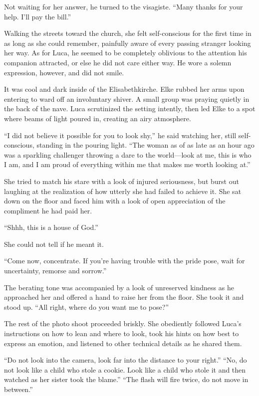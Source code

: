 Not waiting for her answer, he turned to the visagiste. ``Many thanks for your help. I'll pay the bill.''

Walking the streets toward the church, she felt self-conscious for the first time in as long as she could remember, painfully aware of every passing stranger looking her way. As for Luca, he seemed to be completely oblivious to the attention his companion attracted, or else he did not care either way. He wore a solemn expression, however, and did not smile.

\sectionline

It was cool and dark inside of the Elisabethkirche. Elke rubbed her arms upon entering to ward off an involuntary shiver. A small group was praying quietly in the back of the nave. Luca scrutinized the setting intently, then led Elke to a spot where beams of light poured in, creating an airy atmosphere.

``I did not believe it possible for you to look shy,'' he said watching her, still self-conscious, standing in the pouring light. ``The woman as of as late as an hour ago was a sparkling challenger throwing a dare to the world---look at me, this is who I am, and I am proud of everything within me that makes me worth looking at.''

She tried to match his stare with a look of injured seriousness, but burst out laughing at the realization of how utterly she had failed to achieve it. She sat down on the floor and faced him with a look of open appreciation of the compliment he had paid her.

``Shhh, this is a house of God.''

She could not tell if he meant it.

``Come now, concentrate. If you're having trouble with the pride pose, wait for uncertainty, remorse and sorrow.''

The berating tone was accompanied by a look of unreserved kindness as he approached her and offered a hand to raise her from the floor. She took it and stood up. ``All right, where do you want me to pose?''

The rest of the photo shoot proceeded briskly. She obediently followed Luca's instructions on how to lean and where to look, took his hints on how best to express an emotion, and listened to other technical details as he shared them.

``Do not look into the camera, look far into the distance to your right.'' ``No, do not look like a child who stole a cookie. Look like a child who stole it and then watched as her sister took the blame.'' ``The flash will fire twice, do not move in between.''

